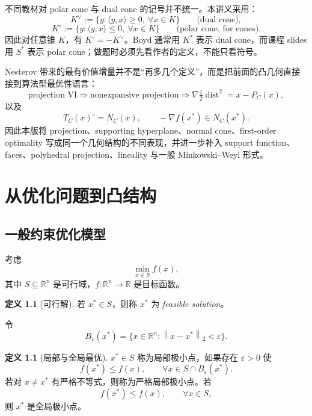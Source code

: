 \documentclass[11pt,a4paper,openany]{ctexrep}
\theoremstyle{definition}
\newtheorem{definition}[theorem]{定义}
\newcommand{\R}{\mathbb{R}}
\newcommand{\dist}{\operatorname{dist}}
\newcommand{\inner}[2]{\langle #1,#2\rangle}
\newcommand{\norm}[1]{\left\lVert #1\right\rVert}
\newcommand{\eps}{\varepsilon}
\begin{document}
\begin{warningbox}
不同教材对 polar cone 与 dual cone 的记号并不统一。本讲义采用：
\[
K^{\vee}:=\{y:\inner{y}{x}\ge 0,\ \forall x\in K\}\qquad\text{(dual cone)},
\]
\[
K^{\circ}:=\{y:\inner{y}{x}\le 0,\ \forall x\in K\}\qquad\text{(polar cone, for cones)}.
\]
因此对任意锥 $K$，有 $K^{\circ}=-K^{\vee}$。Boyd 通常用 $K^*$ 表示 dual cone，而课程 slides 用 $S^*$ 表示 polar cone；做题时必须先看作者的定义，不能只看符号。\cite[\S2.6]{boyd}\cite[Appendix B.2.7]{bental}
\end{warningbox}

\begin{deepdivebox}[本次深化版相对上一版的新增主线]
Nesterov 带来的最有价值增量并不是“再多几个定义”，而是把前面的凸几何直接接到算法型最优性语言：
\[
\text{projection VI}\Rightarrow\text{nonexpansive projection}\Rightarrow
\nabla\tfrac12\dist^2=x-P_C(x),
\]
以及
\[
T_C(x)^\circ=N_C(x),\qquad
-\nabla f(x^*)\in N_C(x^*).
\]
因此本版将 projection、supporting hyperplane、normal cone、first-order optimality 写成同一个几何结构的不同表现，并进一步补入 support function、faces、polyhedral projection、lineality 与一般 Minkowski--Weyl 形式。
\end{deepdivebox}

\chapter{从优化问题到凸结构}

\section{一般约束优化模型}
考虑
\begin{equation}
\min_{x\in S} f(x),
\label{eq:general-opt}
\end{equation}
其中 $S\subseteq\R^n$ 是可行域，$f:\R^n\to\R$ 是目标函数。

\begin{definition}[可行解]
若 $x^*\in S$，则称 $x^*$ 为 \emph{feasible solution}。
\end{definition}

令
\[
B_\eps(x^*)=\{x\in\R^n:\norm{x-x^*}_2<\eps\}.
\]

\begin{definition}[局部与全局最优]
$x^*\in S$ 称为局部极小点，如果存在 $\eps>0$ 使
\[
f(x^*)\le f(x),\qquad \forall x\in S\cap B_\eps(x^*).
\]
若对 $x\ne x^*$ 有严格不等式，则称为严格局部极小点。若
\[
f(x^*)\le f(x),\qquad \forall x\in S,
\]
则 $x^*$ 是全局极小点。
\end{definition}
\end{document}
